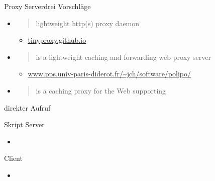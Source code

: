 \begin{frame}{Proxy Server}{drei Vorschläge}
 \begin{itemize}
  \item {}
  \vspace{-5mm}
  \begin{quote}
  lightweight http(s) proxy daemon
  \end{quote}
  \begin{itemize}
   \item {\scriptsize\url{tinyproxy.github.io}}
  \end{itemize}
  \item {}
   \vspace{-5mm}
   \begin{quote} 
   is a lightweight caching and forwarding web proxy server
   \end{quote}
   \begin{itemize}
    \item {\scriptsize\url{www.pps.univ-paris-diderot.fr/~jch/software/polipo/}}
   \end{itemize}
  \item {}
   \vspace{-5mm}
   \begin{quote} 
   is a caching proxy for the Web supporting
   \end{quote}
 \end{itemize}
\end{frame}


\begin{frame}{}{direkter Aufruf}
 \begin{description}[\target]
  \item[\host] Skript Server
  \begin{itemize}
   \item {}
  \end{itemize}
  \item[\target] Client
  \begin{itemize}
   \item {}
  \end{itemize}
 \end{description}
\end{frame}

